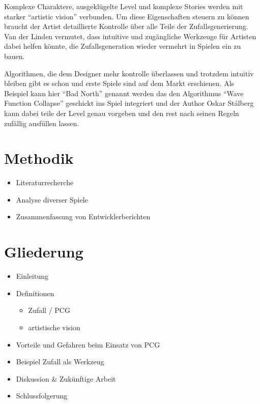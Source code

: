 \documentclass[10pt,a4paper]{article}
\begin{document}
\begin{multicols}{2}
Komplexe Charaktere, ausgeklügelte Level und komplexe Stories werden mit starker “artistic vision” verbunden. Um diese Eigenschaften steuern zu können braucht der Artist detaillierte Kontrolle über alle Teile der Zufallsgenerierung. Van der Linden vermutet, dass intuitive und zugängliche Werkzeuge für Artisten dabei helfen könnte, die Zufallsgeneration wieder vermehrt in Spielen ein zu bauen\cite{VanderLinden2014}.

Algorithmen, die dem Designer mehr kontrolle überlassen und trotzdem intuitiv bleiben gibt es schon und erste Spiele sind auf dem Markt erschienen. Als Beispiel kann hier “Bad North” genannt werden das den Algorithmus “Wave Function Collapse”\cite{Efros1999}\cite{Karth2017} geschickt ins Spiel integriert und der Author Oskar Stålberg kann dabei teile der Level genau vorgeben und den rest nach seinen Regeln zufällig ausfüllen lassen\cite{OskarStalberg2018}.
\end{multicols}

\section{Methodik}
\begin{itemize}
\item Literaturrecherche
\item Analyse diverser Spiele
\item Zusammenfassung von Entwicklerberichten
\end{itemize}

\section{Gliederung}

\begin{itemize}
\item Einleitung
\item Definitionen
\begin{itemize}
\item Zufall / PCG
\item artistische vision
\end{itemize}
\item Vorteile und Gefahren beim Einsatz von PCG
\item Beispiel Zufall als Werkzeug
\item Diskussion \& Zukünftige Arbeit
\item Schlussfolgerung
\end{itemize}


%
%

%


\end{document}

